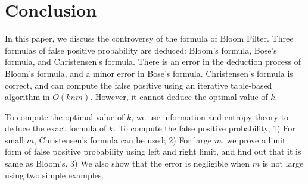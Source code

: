 \section{Conclusion}
\label{sec:conclusion}

In this paper, we discuss the controversy of the formula of Bloom Filter. Three formulas of false positive probability are deduced: Bloom's formula, Bose's formula, and Christensen's formula. There is an error in the deduction process of Bloom's formula, and a minor error in Bose's formula. Christensen's formula is correct, and can compute the false positive using an iterative table-based algorithm in $O(knm)$. However, it cannot deduce the optimal value of $k$.


To compute the optimal value of $k$, we use information and entropy theory to deduce the exact formula of $k$.
To compute the false positive probability, 1) For small $m$, Christensen's formula can be used; 2) For large $m$, we prove a limit form of false positive probability using left and right limit, and find out that it is same as Bloom's. 
3) We also show that the error is negligible when $m$ is not large using two simple examples.